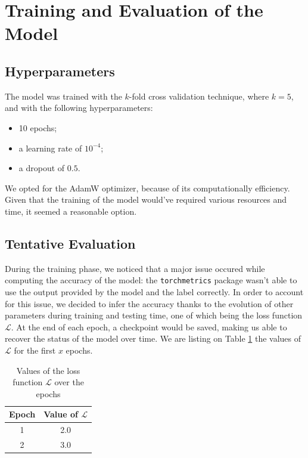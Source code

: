 \documentclass[11pt,journal]{IEEEtran}
\newcommand{\nl}{

\medskip

}
\begin{document}
\section{Training and Evaluation of the Model}

\subsection{Hyperparameters}

The model was trained with the $k$-fold cross validation technique, where $k = 5$, and with the following hyperparameters:
\begin{itemize}
    \item 10 epochs;
    \item a learning rate of $10^{-4}$;
    \item a dropout of $0.5$.
\end{itemize}

\nl We opted for the AdamW optimizer, because of its computationally efficiency. Given that the training of the model would've required various resources and time, it seemed a reasonable option.

\subsection{Tentative Evaluation}

During the training phase, we noticed that a major issue occured while computing the accuracy of the model: the \texttt{torchmetrics} package wasn't able to use the output provided by the model and the label correctly. In order to account for this issue, we decided to infer the accuracy thanks to the evolution of other parameters during training and testing time, one of which being the loss function $\mathcal{L}$. At the end of each epoch, a checkpoint would be saved, making us able to recover the status of the model over time. We are listing on Table \ref{loss_values} the values of $\mathcal{L}$ for the first $x$ epochs.

\begin{table}
    \renewcommand{\arraystretch}{1.3}
    \caption{Values of the loss function $\mathcal{L}$ over the epochs}
    \label{loss_values}
    \centering
    \begin{tabular}{|c|c|}
        \hline
        \bfseries Epoch & \bfseries Value of $\mathcal{L}$ \\
        \hline\hline
        1 & 2.0\\
        \hline
        2 & 3.0 \\
        \hline
    \end{tabular}
\end{table}
\end{document}
